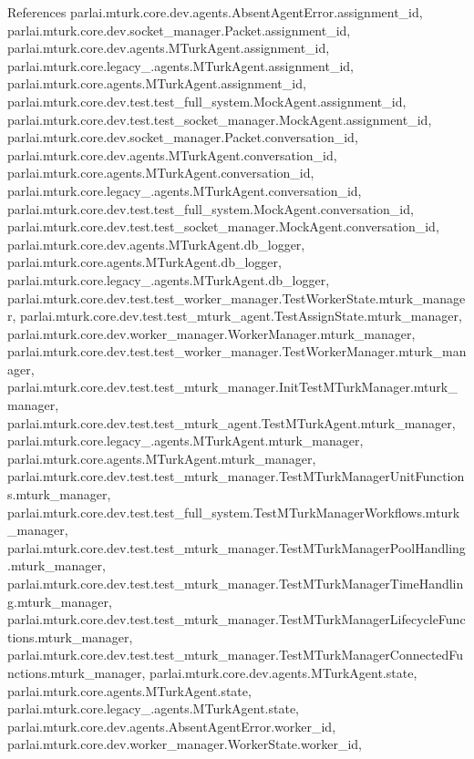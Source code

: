 References parlai.\+mturk.\+core.\+dev.\+agents.\+Absent\+Agent\+Error.\+assignment\+\_\+id, parlai.\+mturk.\+core.\+dev.\+socket\+\_\+manager.\+Packet.\+assignment\+\_\+id, parlai.\+mturk.\+core.\+dev.\+agents.\+M\+Turk\+Agent.\+assignment\+\_\+id, parlai.\+mturk.\+core.\+legacy\+\_.\+agents.\+M\+Turk\+Agent.\+assignment\+\_\+id, parlai.\+mturk.\+core.\+agents.\+M\+Turk\+Agent.\+assignment\+\_\+id, parlai.\+mturk.\+core.\+dev.\+test.\+test\+\_\+full\+\_\+system.\+Mock\+Agent.\+assignment\+\_\+id, parlai.\+mturk.\+core.\+dev.\+test.\+test\+\_\+socket\+\_\+manager.\+Mock\+Agent.\+assignment\+\_\+id, parlai.\+mturk.\+core.\+dev.\+socket\+\_\+manager.\+Packet.\+conversation\+\_\+id, parlai.\+mturk.\+core.\+dev.\+agents.\+M\+Turk\+Agent.\+conversation\+\_\+id, parlai.\+mturk.\+core.\+agents.\+M\+Turk\+Agent.\+conversation\+\_\+id, parlai.\+mturk.\+core.\+legacy\+\_.\+agents.\+M\+Turk\+Agent.\+conversation\+\_\+id, parlai.\+mturk.\+core.\+dev.\+test.\+test\+\_\+full\+\_\+system.\+Mock\+Agent.\+conversation\+\_\+id, parlai.\+mturk.\+core.\+dev.\+test.\+test\+\_\+socket\+\_\+manager.\+Mock\+Agent.\+conversation\+\_\+id, parlai.\+mturk.\+core.\+dev.\+agents.\+M\+Turk\+Agent.\+db\+\_\+logger, parlai.\+mturk.\+core.\+agents.\+M\+Turk\+Agent.\+db\+\_\+logger, parlai.\+mturk.\+core.\+legacy\+\_.\+agents.\+M\+Turk\+Agent.\+db\+\_\+logger, parlai.\+mturk.\+core.\+dev.\+test.\+test\+\_\+worker\+\_\+manager.\+Test\+Worker\+State.\+mturk\+\_\+manager, parlai.\+mturk.\+core.\+dev.\+test.\+test\+\_\+mturk\+\_\+agent.\+Test\+Assign\+State.\+mturk\+\_\+manager, parlai.\+mturk.\+core.\+dev.\+worker\+\_\+manager.\+Worker\+Manager.\+mturk\+\_\+manager, parlai.\+mturk.\+core.\+dev.\+test.\+test\+\_\+worker\+\_\+manager.\+Test\+Worker\+Manager.\+mturk\+\_\+manager, parlai.\+mturk.\+core.\+dev.\+test.\+test\+\_\+mturk\+\_\+manager.\+Init\+Test\+M\+Turk\+Manager.\+mturk\+\_\+manager, parlai.\+mturk.\+core.\+dev.\+test.\+test\+\_\+mturk\+\_\+agent.\+Test\+M\+Turk\+Agent.\+mturk\+\_\+manager, parlai.\+mturk.\+core.\+legacy\+\_.\+agents.\+M\+Turk\+Agent.\+mturk\+\_\+manager, parlai.\+mturk.\+core.\+agents.\+M\+Turk\+Agent.\+mturk\+\_\+manager, parlai.\+mturk.\+core.\+dev.\+test.\+test\+\_\+mturk\+\_\+manager.\+Test\+M\+Turk\+Manager\+Unit\+Functions.\+mturk\+\_\+manager, parlai.\+mturk.\+core.\+dev.\+test.\+test\+\_\+full\+\_\+system.\+Test\+M\+Turk\+Manager\+Workflows.\+mturk\+\_\+manager, parlai.\+mturk.\+core.\+dev.\+test.\+test\+\_\+mturk\+\_\+manager.\+Test\+M\+Turk\+Manager\+Pool\+Handling.\+mturk\+\_\+manager, parlai.\+mturk.\+core.\+dev.\+test.\+test\+\_\+mturk\+\_\+manager.\+Test\+M\+Turk\+Manager\+Time\+Handling.\+mturk\+\_\+manager, parlai.\+mturk.\+core.\+dev.\+test.\+test\+\_\+mturk\+\_\+manager.\+Test\+M\+Turk\+Manager\+Lifecycle\+Functions.\+mturk\+\_\+manager, parlai.\+mturk.\+core.\+dev.\+test.\+test\+\_\+mturk\+\_\+manager.\+Test\+M\+Turk\+Manager\+Connected\+Functions.\+mturk\+\_\+manager, parlai.\+mturk.\+core.\+dev.\+agents.\+M\+Turk\+Agent.\+state, parlai.\+mturk.\+core.\+agents.\+M\+Turk\+Agent.\+state, parlai.\+mturk.\+core.\+legacy\+\_.\+agents.\+M\+Turk\+Agent.\+state, parlai.\+mturk.\+core.\+dev.\+agents.\+Absent\+Agent\+Error.\+worker\+\_\+id, parlai.\+mturk.\+core.\+dev.\+worker\+\_\+manager.\+Worker\+State.\+worker\+\_\+id, 